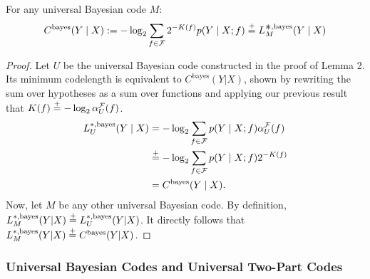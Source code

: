 \begin{cor}
For any universal Bayesian code $M$:
\begin{equation}
C^{\text{bayes}}(Y \mid X) := -\log_2 \sum_{f \in \gF} 2^{-K(f)} p(Y \mid X;f) \eqc L^{\bigast,\text{bayes}}_M(Y \mid X)
\end{equation}
\end{cor}

\begin{proof}
Let $U$ be the universal Bayesian code constructed in the proof of Lemma 2. Its minimum codelength is equivalent to $C^{\text{bayes}}(Y|X)$, shown by rewriting the sum over hypotheses as a sum over functions and applying our previous result that $K(f) \stackrel{+}{=} -\log_2 \alpha_{U}^{\mathcal{F}}(f)$.
\begin{align*}
    L_{U}^{*,\text{bayes}}(Y \mid X) &= -\log_2 \sum_{f \in \mathcal{F}} p(Y \mid X;f) \alpha_{U}^{\mathcal{F}}(f) \\
    &\stackrel{+}{=} -\log_{2}\sum_{f\in\mathcal{F}}p(Y \mid X;f)2^{-K(f)} \\
    &= C^{\text{bayes}}(Y \mid X).
\end{align*}
Now, let $M$ be any other universal Bayesian code. By definition, $L_{M}^{*,\text{bayes}}(Y|X) \stackrel{+}{=} L_{U}^{*,\text{bayes}}(Y|X)$. It directly follows that $L_{M}^{*,\text{bayes}}(Y|X) \stackrel{+}{=} C^{\text{bayes}}(Y|X)$.
\end{proof}

\subsubsection{Universal Bayesian Codes and Universal Two-Part Codes}
\label{sec:relation-bayesian-two-part}

